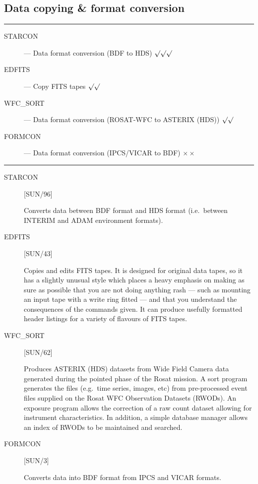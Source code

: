 \newpage

\subsection{Data copying \& format conversion}

\rule{\textwidth}{0.5mm}
\begin{description}
\begin{description}
\item [STARCON] --- Data format conversion (BDF to HDS) \hfill $\surd\surd\surd$
\item [EDFITS] --- Copy FITS tapes \hfill $\surd\surd$
\item [WFC\_SORT] --- Data format conversion (ROSAT-WFC to ASTERIX (HDS))
 \hfill $\surd\surd$
\item [FORMCON] --- Data format conversion (IPCS/VICAR to BDF) \hfill
 $\times\times$
\end{description}
\end{description}
\rule{\textwidth}{0.5mm}

\begin{description}

\item [STARCON] \hfill [SUN/96]

Converts data between BDF format and HDS format (i.e.\ between INTERIM and ADAM
environment formats).

\item [EDFITS] \hfill [SUN/43]

Copies and edits FITS tapes.
It is designed for original data tapes, so it has a slightly unusual style
which places a heavy emphasis on making as sure as possible that you
are not doing anything rash --- such as mounting an input tape with a write 
ring fitted --- and that you understand the consequences of the commands given.
It can produce usefully formatted header listings for a variety of flavours of
FITS tapes.

\item [WFC\_SORT] \hfill [SUN/62]

Produces ASTERIX (HDS) datasets from Wide Field Camera data generated during
the pointed phase of the Rosat mission.
A sort program generates the files (e.g.\ time series, images, etc) from
pre-processed event files supplied on the Rosat WFC Observation Datasets
(RWODs).
An exposure program allows the correction of a raw count dataset allowing for
instrument characteristics.
In addition, a simple database manager allows an index of RWODs to be
maintained and searched.

\item [FORMCON] \hfill [SUN/3]

Converts data into BDF format from IPCS and VICAR formats.

\end{description}


